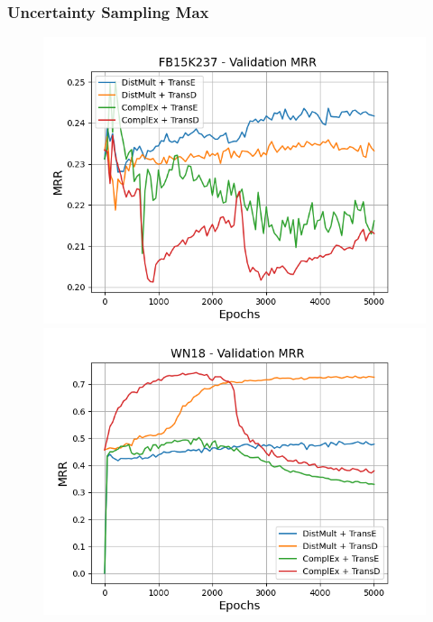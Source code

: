 \subsubsection{Uncertainty Sampling Max}


\begin{figure}
    \centering
    \begin{minipage}{.3\textwidth}
      \centering
      \includegraphics[width=\linewidth]{figures/results/gan_train/pretrained/uncertainty/max/entropy/fb15k237/5k_epochs/uncertainty_fb15k237_mrrs.png}
    \end{minipage}%
    \begin{minipage}{.3\textwidth}
      \centering
      \includegraphics[width=\linewidth]{figures/results/gan_train/pretrained/uncertainty/max/entropy/wn18/5k_epochs/uncertainty_wn18_mrrs.png}

\end{minipage}
\end{figure}
